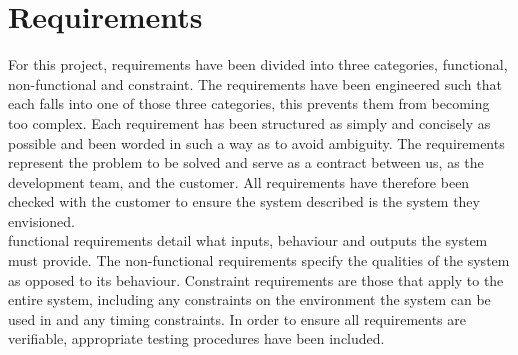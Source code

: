\documentclass[10pt,a4paper]{article}
\begin{document}
\section{Requirements}
For this project, requirements have been divided into three categories,
functional, non-functional and constraint. The requirements have been
engineered such that each falls into one of those three categories, this
prevents them from becoming too complex. Each requirement has been
structured as simply and concisely as possible and been worded in such a way
as to avoid ambiguity. The requirements represent the problem to be solved
and serve as a contract between us, as the development team, and the
customer. All requirements have therefore been checked with the customer to
ensure the system described is the system they envisioned.\\
functional requirements detail what inputs, behaviour and outputs the system
must provide. The non-functional requirements specify the qualities of the
system as opposed to its behaviour. Constraint requirements are those that apply
to the entire system, including any constraints on the environment the system
can be used in and any timing constraints. In order to ensure all requirements
are verifiable, appropriate testing procedures have been included.






\end{document}
